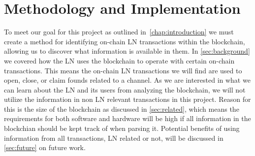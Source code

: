 \chapter{Methodology and Implementation}
\label{chap:metodology}

To meet our goal for this project as outlined in~\cref{chap:introduction} we must create a method for identifying on-chain LN transactions within the blockchain, allowing us to discover what information is available in them. In \cref{sec:background} we covered how the LN uses the blockchain to operate with certain on-chain transactions. This means the on-chain LN transactions we will find are used to open, close, or claim founds related to a channel. As we are interested in what we can learn about the LN and its users from analyzing the blockchain, we will not utilize the information in non LN relevant transactions in this project. Reason for this is the size of the blockchain as discussed in \cref{sec:related}, which means the requirements for both software and hardware will be high if all information in the blockchian should be kept track of when parsing it. Potential benefits of using information from all transactions, LN related or not, will be discussed in \cref{sec:future} on future work. 
\\

